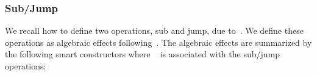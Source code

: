\subsubsection{Sub/Jump}
We recall how to define two operations, sub and jump, due to~\cite{thielecke1997phd,DBLP:conf/csl/FioreS14}.
We define these operations as algebraic effects following~\citet{SchrijversPWJ19}.
The algebraic effects are summarized by the following smart constructors where ~ is associated with the sub/jump operations:
%
\begin{code}[hide]%
%
\>[4]\AgdaSpace{}%
\AgdaSpace{}%
\AgdaSpace{}%
\AgdaSpace{}%
\AgdaSymbol{:}\AgdaSpace{}%
\AgdaSpace{}%
\AgdaSpace{}%
\AgdaSymbol{(}\AgdaSpace{}%
\AgdaSymbol{:}\AgdaSpace{}%
\AgdaSpace{}%
\AgdaSpace{}%
\AgdaSymbol{)}\AgdaSpace{}%
\AgdaSymbol{:}\AgdaSpace{}%
\AgdaSpace{}%
\<%
\\
\>[4][@{}l@{\AgdaIndent{0}}]%
\>[6]%
\>[12]\AgdaSymbol{:}\AgdaSpace{}%
\AgdaSymbol{\{}\AgdaSpace{}%
\AgdaSymbol{:}\AgdaSpace{}%
\AgdaSymbol{\}}%
\>[51]%
\>[54]\AgdaSpace{}%
\<%
\\
%
\>[6]%
\>[12]\AgdaSymbol{:}\AgdaSpace{}%
\AgdaSymbol{\{}\AgdaSpace{}%
\AgdaSymbol{:}\AgdaSpace{}%
\AgdaSymbol{\}}\AgdaSpace{}%
\AgdaSymbol{(}\AgdaSpace{}%
\AgdaSymbol{:}\AgdaSpace{}%
\AgdaSpace{}%
\AgdaSymbol{)}\AgdaSpace{}%
\AgdaSymbol{(}\AgdaSpace{}%
\AgdaSymbol{:}\AgdaSpace{}%
\AgdaSpace{}%
\AgdaSpace{}%
\AgdaSymbol{)}\AgdaSpace{}%
%
\>[55]\AgdaSpace{}%
\<%
\\
%
\\[\AgdaEmptyExtraSkip]%
%
\>[4]\AgdaSpace{}%
\AgdaSymbol{:}\AgdaSpace{}%
\AgdaSpace{}%
\AgdaSpace{}%
\AgdaSymbol{:}\AgdaSpace{}%
\AgdaSpace{}%
\AgdaSpace{}%
\AgdaSymbol{(}\AgdaSpace{}%
\AgdaSymbol{:}\AgdaSpace{}%
\AgdaSpace{}%
\AgdaSpace{}%
\AgdaSymbol{)}\AgdaSpace{}%
\AgdaSpace{}%
\<%
\\

\end{code}
